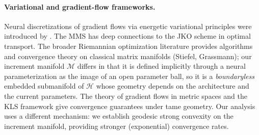 \documentclass[twoside,11pt]{article}
\newcommand{\calH}{\mathcal{H}}
\newcommand{\calM}{\mathcal{M}}
\begin{document}
{%
\paragraph{Variational and gradient-flow frameworks.}
Neural discretizations of gradient flows via energetic variational principles were introduced by \citet{HuEnergetic2024}.
The MMS has deep connections to the JKO scheme \citep{jordan1998variational} in optimal transport.
The broader Riemannian optimization literature \citep{absil2008optimization,boumal2023intromanifolds} provides algorithms and convergence theory on classical matrix manifolds (Stiefel, Grassmann); our increment manifold $\calM$ differs in that it is defined implicitly through a neural parameterization as the image of an open parameter ball, so it is a \emph{boundaryless} embedded submanifold of $\calH$ whose geometry depends on the architecture and the current parameters.
The theory of gradient flows in metric spaces \citep{ambrosio2005gradient} and the KLS framework \citep{hauer2019kurdyka,attouch2013convergence} give convergence guarantees under tame geometry.
Our analysis uses a different mechanism: we establish geodesic strong convexity on the increment manifold, providing stronger (exponential) convergence rates.

}
\end{document}
